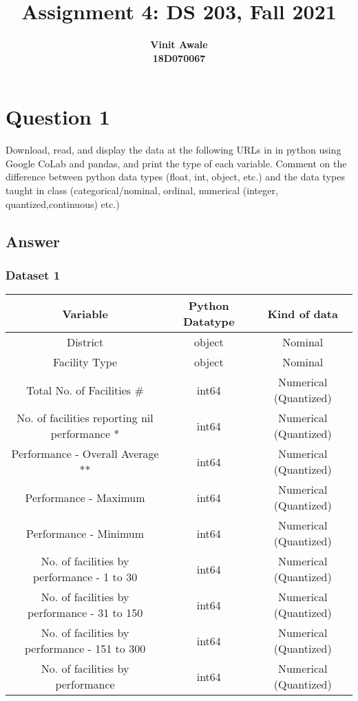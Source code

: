 \documentclass[12pt]{article}
\title{Assignment 4: DS 203, Fall 2021}
\author{\textbf{Vinit Awale} \\
        \textbf{18D070067}}
\date{}
\begin{document}
\maketitle

\section*{Question 1}
Download, read, and display the data at the following URLs in in python using Google CoLab and pandas, and print the type of each variable. Comment on the difference between python data types (float, int, object, etc.) and the data types taught in class (categorical/nominal, ordinal, numerical (integer, quantized,continuous) etc.)
\subsection*{Answer}
\subsubsection*{Dataset 1}
\begin{center}
    \begin{tabular}{ |c|c|c| } 
    \hline
    Variable & Python Datatype & Kind of data \\
    \hline
    District                                        & object & Nominal\\
    Facility Type                                   & object & Nominal\\
    Total No. of Facilities #                       & int64  & Numerical (Quantized) \\
    No. of facilities reporting nil performance *   & int64  & Numerical (Quantized) \\
    Performance - Overall Average **                & int64  & Numerical (Quantized) \\
    Performance - Maximum                           &  int64 & Numerical (Quantized) \\
    Performance - Minimum                           &  int64 & Numerical (Quantized) \\
    No. of facilities by performance - 1 to 30      &  int64 & Numerical (Quantized) \\
    No. of facilities by performance - 31 to 150    &  int64 & Numerical (Quantized) \\
    No. of facilities by performance - 151 to 300   &  int64 & Numerical (Quantized)\\
    No. of facilities by performance \geq 300       &  int64 & Numerical (Quantized) \\
    \hline
    \end{tabular}
\end{center}
\end{document}
